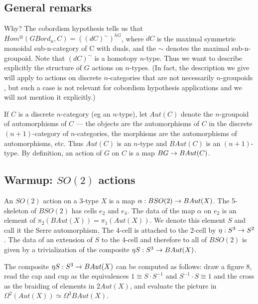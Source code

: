 \documentclass{amsart}
\begin{document}

\subsection{General remarks}

Why? The cobordism hypothesis tells us that $Hom^{\otimes}(GBord_n,C) = ((dC)^{\sim})^{hG}$, where $dC$ is the maximal symmetric monoidal sub-n-category of C with duals, and the $\sim$ denotes the maximal sub-n-groupoid.  Note that $(dC)^\sim$ is a homotopy $n$-type.  Thus we want to describe explicitly the structure of $G$ actions on $n$-types.  (In fact, the description we give will apply to actions on discrete $n$-categories that are not necessarily $n$-groupoids , but such a case is not relevant for cobordism hypothesis applications and we will not mention it explicitly.)

If $C$ is a discrete $n$-category (eg an $n$-type), let $Aut(C)$ denote the $n$-groupoid of automorphisms of $C$ --- the objects are the automorphisms of $C$ in the discrete $(n+1)$-category of $n$-categories, the morphisms are the automorphisms of automorphisms, etc.  Thus $Aut(C)$ is an $n$-type and $BAut(C)$ is an $(n+1)$-type.  By definition, an action of $G$ on $C$ is a map $BG \rightarrow BAut(C)$.

\subsection{Warmup: $SO(2)$ actions}

An $SO(2)$ action on a 3-type $X$ is a map $\alpha: BSO(2) \rightarrow BAut(X)$.  The 5-skeleton of $BSO(2)$ has cells $e_2$ and $e_4$.  The data of the map $\alpha$ on $e_2$ is an element of $\pi_2(BAut(X)) = \pi_1(Aut(X))$.  We denote this element $S$ and call it the Serre automorphism.  The 4-cell is attached to the 2-cell by $\eta : S^3 \rightarrow S^2$.  The data of an extension of $S$ to the 4-cell and therefore to all of $BSO(2)$ is given by a trivialization of the composite $\eta S : S^3 \rightarrow BAut(X)$.

\begin{proposition}
The composite $\eta S : S^3 \rightarrow BAut(X)$ can be computed as follows: draw a figure 8, read the cap and cup as the equivalences $1 \cong S \cdot S^{-1}$ and $S^{-1} \cdot S \cong 1$ and the cross as the braiding of elements in $2Aut(X)$, and evaluate the picture in $\Omega^2(Aut(X)) \simeq \Omega^3 BAut(X)$.
\end{proposition}
\end{document}
